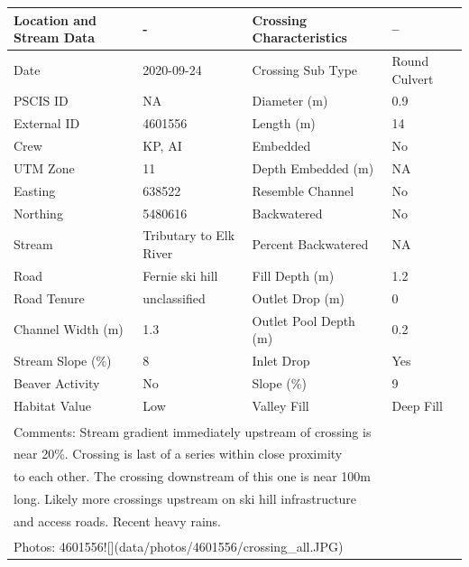 \documentclass[
]{book}
\begin{document}
\begin{tabular}{llll}
\toprule
Location and Stream Data & - & Crossing Characteristics & --\\
\midrule
Date & 2020-09-24 & Crossing Sub Type & Round Culvert\\
PSCIS ID & NA & Diameter (m) & 0.9\\
External ID & 4601556 & Length (m) & 14\\
Crew & KP, AI & Embedded & No\\
UTM Zone & 11 & Depth Embedded (m) & NA\\
\addlinespace
Easting & 638522 & Resemble Channel & No\\
Northing & 5480616 & Backwatered & No\\
Stream & Tributary to Elk River & Percent Backwatered & NA\\
Road & Fernie ski hill & Fill Depth (m) & 1.2\\
Road Tenure & unclassified & Outlet Drop (m) & 0\\
\addlinespace
Channel Width (m) & 1.3 & Outlet Pool Depth (m) & 0.2\\
Stream Slope (\%) & 8 & Inlet Drop & Yes\\
Beaver Activity & No & Slope (\%) & 9\\
Habitat Value & Low & Valley Fill & Deep Fill\\
\bottomrule
\multicolumn{4}{l}{\textsuperscript{} Comments: Stream gradient immediately upstream of crossing is}\\
\multicolumn{4}{l}{near 20\%. Crossing is last of a series within close proximity}\\
\multicolumn{4}{l}{to each other. The crossing downstream of this one is near 100m}\\
\multicolumn{4}{l}{long. Likely more crossings upstream on ski hill infrastructure}\\
\multicolumn{4}{l}{and access roads. Recent heavy rains.}\\
\multicolumn{4}{l}{\textsuperscript{} Photos: 4601556![](data/photos/4601556/crossing\_all.JPG)}\\
\end{tabular}
\end{document}
